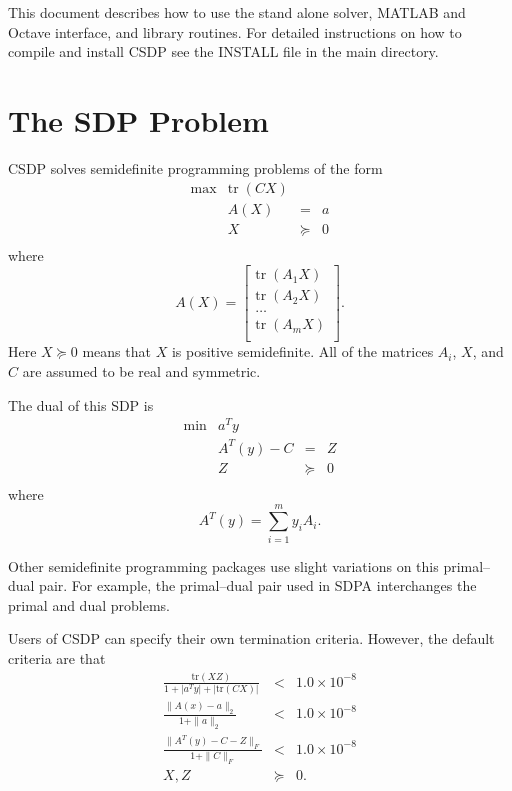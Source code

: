 \documentclass{article}
\begin{document}
This document describes how to use the stand alone solver, MATLAB and
Octave interface, and library routines.  For detailed instructions on
how to compile and install CSDP see the INSTALL file in the main
directory.

\clearpage
\section*{The SDP Problem}
CSDP solves semidefinite programming problems of the form
\begin{equation}
\begin{array}{rrcl}
\max  & \mbox{tr}\; (CX) & & \\
      & A(X) & = & a \\
      & X                   & \succeq & 0 \\
\end{array}
\end{equation}
where 
\begin{equation}
A(X)=\left[
\begin{array}{c}
\mbox{tr} \; (A_{1} X) \\
\mbox{tr} \; (A_{2} X) \\
\ldots \\
\mbox{tr} \; (A_{m} X) \\
\end{array}
\right].
\end{equation}
Here $X \succeq 0$ means that $X$ is positive semidefinite.  All of
the matrices $A_{i}$, $X$, and $C$ are assumed to be
real and symmetric.

The dual of this SDP is
\begin{equation}
\begin{array}{rrcl}
\min  & a^{T}y  & & \\
      & A^{T}(y)-C & = & Z \\
      & Z                   & \succeq & 0 \\
\end{array}
\end{equation}
where
\begin{equation}
A^{T}(y)=\sum_{i=1}^{m} y_{i}A_{i}.
\end{equation}

Other semidefinite programming packages use slight variations on this
primal--dual pair.  For example, the primal--dual pair used in SDPA 
interchanges the primal and dual problems.

Users of CSDP can specify their own termination criteria.  However, the
default criteria are that 
\begin{equation}
\begin{array}{rcl}
   \frac{\mbox{tr}(XZ)}{1+ | a^{T}y| + | \mbox{tr}(CX)|} &  <  & 1.0 \times 10^{-8} \\ 
   \frac{\| A(x)- a\|_{2}}{1 + \| a \|_{2}} & < &  1.0 \times 10^{-8} \\ 
   \frac{\| A^{T}(y) -C -Z \|_{F}}{1 + \|C\|_{F}} & < & 1.0 \times 10^{-8} \\
   X,Z & \succeq & 0. \\
\end{array}
\end{equation}
\end{document}
